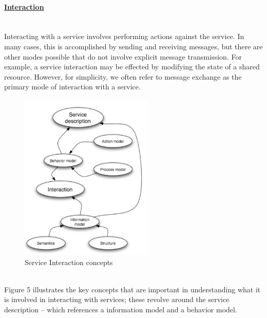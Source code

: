 \documentclass[10pt,a4paper]{article}
\newcommand{\myparagraph}[1]{\paragraph{\uline{#1}}\mbox{}\\[0.05in]}
\begin{document}
 \pagebreak
 \myparagraph{Interaction}
Interacting with a service involves performing actions against the service. In many cases, this is accomplished by sending and receiving messages, but there are other modes possible that do not involve explicit message transmission. For example, a service interaction may be effected by modifying the state of a shared resource. However, for simplicity, we often refer to message exchange as the primary mode of interaction with a service.
\begin{figure}[h!]
 \hfill \includegraphics[width=180pt]{images/interaction}\hspace*{\fill}
  \caption{Service Interaction concepts}
  \label{fig:interaction}
\end{figure}  \\
Figure 5 illustrates the key concepts that are important in understanding what it is involved in interacting with services; these revolve around the service description – which references a information model and a behavior model.
\end{document}
